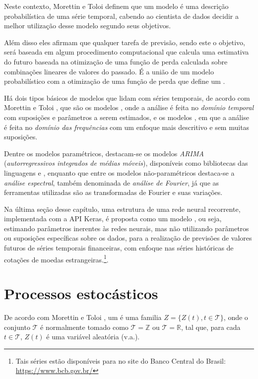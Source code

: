 Neste contexto, Morettin e Toloi \citep{morettin} definem que um modelo é uma descrição probabilística de uma série temporal, cabendo ao cientista de dados decidir a melhor utilização desse modelo segundo seus objetivos. 

Além disso eles afirmam que qualquer tarefa de previsão, sendo este o objetivo, será baseada em algum procedimento computacional que calcula uma estimativa do futuro baseada na otimização de uma função de perda calculada sobre combinações lineares de valores do passado. É a união de um modelo probabilístico com a otimização de uma função de perda que define um .

Há dois tipos básicos de modelos que lidam com séries temporais, de acordo com Morettin e Toloi \citep{morettin}, que são os modelos , onde a análise é feita no \emph{domínio temporal} com suposições e parâmetros a serem estimados, e os modelos , em que a análise é feita no \emph{domínio das frequências} com um enfoque mais descritivo e sem muitas suposições.

Dentre os modelos paramétricos, destacam-se os modelos \emph{ARIMA} (\emph{autorregressivos integrados de médias móveis}), disponíveis como bibliotecas das linguagens  e , enquanto que entre os modelos não-paramétricos destaca-se a \emph{análise espectral}, também denominada de \emph{análise de Fourier}, já que as ferramentas utilizadas são as transformadas de Fourier e suas variações.

Na última seção desse capítulo, uma estrutura de uma rede neural recorrente, implementada com a API Keras, é proposta como um modelo , ou seja, estimando parâmetros inerentes às redes neurais, mas não utilizando parâmetros ou suposições específicas sobre os dados, para a realização de previsões de valores futuros de séries temporais financeiras, com enfoque nas séries históricas de cotações de moedas estrangeiras.\footnote{Tais séries estão disponíveis para  no site do Banco Central do Brasil: \url{https://www.bcb.gov.br/}}.

\section{Processos estocásticos}

De acordo com Morettin e Toloi \citep{morettin}, um  é uma familia $Z = \{ Z(t), t \in \mathcal{T} \}$, onde o conjunto $\mathcal{T}$ é normalmente tomado como $\mathcal{T} = \mathbb{Z}$ ou $\mathcal{T} = \mathbb{R}$, tal que, para cada $t \in \mathcal{T}$, $Z(t)$ é uma variável aleatória (v.a.). 

